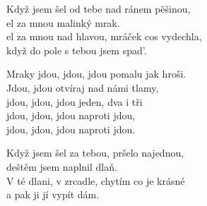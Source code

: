 
\ve{}
Když jsem šel od tebe nad ránem pěšinou,\\
el za mnou malinký mrak.\\
el za mnou nad hlavou, mráček cos vydechla,\\
když do pole s tebou jsem spad'.

\cho{}
Mraky jdou, jdou, jdou pomalu jak hroši. \\
Jdou, jdou otvíraj nad námi tlamy, \\
jdou, jdou, jdou jeden, dva i tři \\
jdou, jdou, jdou naproti jdou,\\
jdou, jdou, jdou naproti jdou.

\ve{}
Když jsem šel za tebou, pršelo najednou,\\
deštěm jsem naplnil dlaň.\\
V té dlani, v zrcadle, chytím co je krásné\\
a pak ji jí vypít dám. 

\cho{}

\esong